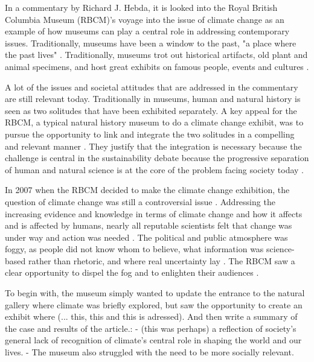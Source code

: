 In a commentary by Richard J. Hebda, it is looked into the Royal British Columbia Museum (RBCM)’s voyage into the issue of climate change as an example of how museums can play a central role in addressing contemporary issues. Traditionally, museums have been a window to the past, "a place where the past lives" \autocite[p. 1]{hebda_article}.  Traditionally, museums trot out historical artifacts, old plant and animal specimens, and host great exhibits on famous people, events and cultures \autocite[p.1]{hebda_article}.
\par
A lot of the issues and societal attitudes that are addressed in the commentary are still relevant today. Traditionally in museums, human and natural history is seen as two solitudes that have been exhibited separately. A key appeal for the RBCM, a typical natural history museum to do a climate change exhibit, was to pursue the opportunity to link and integrate the two solitudes in a compelling and relevant manner \autocite[p. 2]{hebda_article}. They justify that the integration is necessary because the challenge is central in the sustainability debate because the progressive separation of human and natural science is at the core of the problem facing society today \autocite[p.2]{hebda_article}.

In 2007 when the RBCM decided to make the climate change exhibition, the question of climate change was still a controversial issue \autocite[p.2]{hebda_article}. Addressing the increasing evidence and knowledge in terms of climate change and how it affects and is affected by humans, nearly all reputable scientists felt that change was under way and action was needed \autocite[p.2]{hebda_article}. The political and public atmosphere was foggy, as people did not know whom to believe, what information was science-based rather than rhetoric, and where real uncertainty lay \autocite[p.2]{hebda_article}. The RBCM saw a clear opportunity to dispel the fog and to enlighten their audiences \autocite[p.2]{hebda_article}.

To begin with, the museum simply wanted to update the entrance to the natural gallery where climate was briefly explored, but saw the opportunity to create an exhibit where (... this, this and this is adressed). And then write a summary of the case and results of the article.:
- (this was perhaps) a reflection of society’s general lack of recognition of climate’s central role in shaping the world and our lives.
- The museum also struggled with the need to be more socially relevant.

